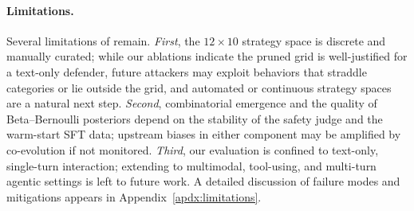 \paragraph{Limitations.} Several limitations of \method remain. \emph{First}, the $12\times10$ strategy space is discrete and manually curated; while our ablations indicate the pruned grid is well-justified for a text-only defender, future attackers may exploit behaviors that straddle categories or lie outside the grid, and automated or continuous strategy spaces are a natural next step. \emph{Second}, combinatorial emergence and the quality of Beta--Bernoulli posteriors depend on the stability of the safety judge and the warm-start SFT data; upstream biases in either component may be amplified by co-evolution if not monitored. \emph{Third}, our evaluation is confined to text-only, single-turn interaction; extending \method to multimodal, tool-using, and multi-turn agentic settings is left to future work. A detailed discussion of failure modes and mitigations appears in Appendix~\ref{apdx:limitations}.

